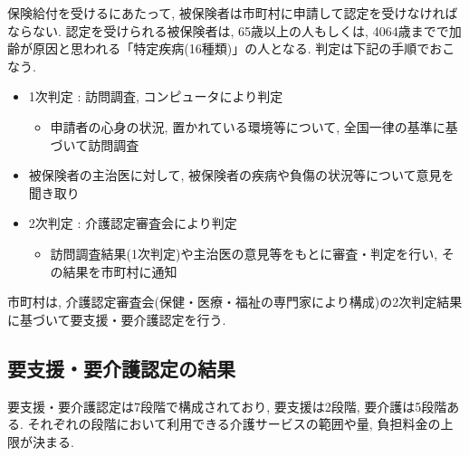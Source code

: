 保険給付を受けるにあたって, 被保険者は市町村に申請して認定を受けなければならない.
認定を受けられる被保険者は, 65歳以上の人もしくは, 4064歳までで加齢が原因と思われる「特定疾病(16種類)」の人となる.
判定は下記の手順でおこなう.
\begin{itemize} \setlength{\itemsep}{-0.5mm} \setlength{\parskip}{-0.5mm}
	\item 1次判定  :  訪問調査, コンピュータにより判定
	      \begin{itemize} \setlength{\itemsep}{-0.5mm} \setlength{\parskip}{-0.5mm}
		      \item 申請者の心身の状況, 置かれている環境等について, 全国一律の基準に基づいて訪問調査
	      \end{itemize}
	\item 被保険者の主治医に対して, 被保険者の疾病や負傷の状況等について意見を聞き取り
	\item 2次判定  :  介護認定審査会により判定
	      \begin{itemize} \setlength{\itemsep}{-0.5mm} \setlength{\parskip}{-0.5mm}
		      \item 訪問調査結果(1次判定)や主治医の意見等をもとに審査・判定を行い, その結果を市町村に通知
	      \end{itemize}
\end{itemize}
市町村は, 介護認定審査会(保健・医療・福祉の専門家により構成)の2次判定結果に基づいて要支援・要介護認定を行う.

\subsection{要支援・要介護認定の結果}
要支援・要介護認定は7段階で構成されており,  要支援は2段階, 要介護は5段階ある.
それぞれの段階において利用できる介護サービスの範囲や量, 負担料金の上限が決まる.

